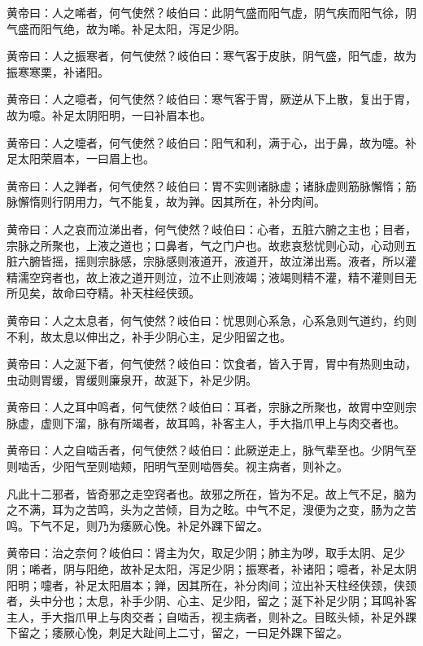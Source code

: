 \documentclass[12pt,UTF8]{ctexbook}
\begin{document}
	黄帝曰：人之唏者，何气使然？岐伯曰：此阴气盛而阳气虚，阴气疾而阳气徐，阴气盛而阳气绝，故为唏。补足太阳，泻足少阴。
	
	黄帝曰：人之振寒者，何气使然？岐伯曰：寒气客于皮肤，阴气盛，阳气虚，故为振寒寒栗，补诸阳。
	
	黄帝曰：人之噫者，何气使然？岐伯曰：寒气客于胃，厥逆从下上散，复出于胃，故为噫。补足太阴阳明，一曰补眉本也。
	
	黄帝曰：人之嚏者，何气使然？岐伯曰：阳气和利，满于心，出于鼻，故为嚏。补足太阳荣眉本，一曰眉上也。
	
	黄帝曰：人之亸者，何气使然？岐伯曰：胃不实则诸脉虚；诸脉虚则筋脉懈惰；筋脉懈惰则行阴用力，气不能复，故为亸。因其所在，补分肉间。
	
	黄帝曰：人之哀而泣涕出者，何气使然？岐伯曰：心者，五脏六腑之主也；目者，宗脉之所聚也，上液之道也；口鼻者，气之门户也。故悲哀愁忧则心动，心动则五脏六腑皆摇，摇则宗脉感，宗脉感则液道开，液道开，故泣涕出焉。液者，所以灌精濡空窍者也，故上液之道开则泣，泣不止则液竭；液竭则精不灌，精不灌则目无所见矣，故命曰夺精。补天柱经侠颈。
	
	黄帝曰：人之太息者，何气使然？岐伯曰：忧思则心系急，心系急则气道约，约则不利，故太息以伸出之，补手少阴心主，足少阳留之也。
	
	黄帝曰：人之涎下者，何气使然？岐伯曰：饮食者，皆入于胃，胃中有热则虫动，虫动则胃缓，胃缓则廉泉开，故涎下，补足少阴。
	
	黄帝曰：人之耳中鸣者，何气使然？岐伯曰：耳者，宗脉之所聚也，故胃中空则宗脉虚，虚则下溜，脉有所竭者，故耳鸣，补客主人，手大指爪甲上与肉交者也。
	
	黄帝曰：人之自啮舌者，何气使然？岐伯曰：此厥逆走上，脉气辈至也。少阴气至则啮舌，少阳气至则啮颊，阳明气至则啮唇矣。视主病者，则补之。
	
	凡此十二邪者，皆奇邪之走空窍者也。故邪之所在，皆为不足。故上气不足，脑为之不满，耳为之苦鸣，头为之苦倾，目为之眩。中气不足，溲便为之变，肠为之苦鸣。下气不足，则乃为痿厥心悗。补足外踝下留之。
	
	黄帝曰：治之奈何？岐伯曰：肾主为欠，取足少阴；肺主为哕，取手太阴、足少阴；唏者，阴与阳绝，故补足太阳，泻足少阴；振寒者，补诸阳；噫者，补足太阴阳明；嚏者，补足太阳眉本；亸，因其所在，补分肉间；泣出补天柱经侠颈，侠颈者，头中分也；太息，补手少阴、心主、足少阳，留之；涎下补足少阴；耳鸣补客主人，手大指爪甲上与肉交者；自啮舌，视主病者，则补之。目眩头倾，补足外踝下留之；痿厥心悗，刺足大趾间上二寸，留之，一曰足外踝下留之。
	
\part{}
	
\end{document}
